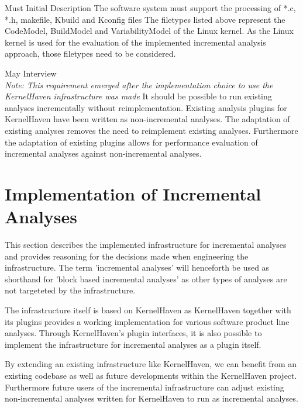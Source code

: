 \documentclass[a4paper]{article}
\begin{document}
\clearpage
\begin{req} 
\reqtable
    {Must}  {Initial Description}
	{The software system must support the processing of *.c, *.h, makefile, Kbuild and Kconfig files}
	{The filetypes listed above represent the CodeModel, BuildModel and VariabilityModel of the Linux kernel. As the Linux kernel is used for the evaluation of the implemented incremental analysis approach, those filetypes need to be considered.}
\end{req}





\begin{req} 
\reqtable
    {May}  {Interview \\ \emph{Note: This requirement emerged after the implementation choice to use the KernelHaven infrastructure was made}}
	{It should be possible to run existing analyses incrementally without reimplementation.}
	{Existing analysis plugins for KernelHaven have been written as non-incremental analyses. The adaptation of existing analyses removes the need to reimplement existing analyses. Furthermore the adaptation of existing plugins allows for performance evaluation of incremental analyses against non-incremental analyses.}
\end{req}

\newpage

\section{Implementation of Incremental Analyses}

This section describes the implemented infrastructure for incremental analyses and provides reasoning for the decisions made when engineering the infrastructure. The term 'incremental analyses' will henceforth be used as shorthand for  'block based incremental analyses' as other types of analyses are not targeteted by the infrastructure.

The infrastructure itself is based on KernelHaven\cite{KernelHaven} as KernelHaven together with its plugins provides a working implementation for various software product line analyses. Through KernelHaven's plugin interfaces, it is also possible to implement the infrastructure for incremental analyses as a plugin itself.

By extending an existing infrastructure like KernelHaven, we can benefit from an existing codebase as well as future developments within the KernelHaven project. Furthermore future users of the incremental infrastructure can adjust existing non-incremental analyses written for KernelHaven to run as incremental analyses.
\end{document}
